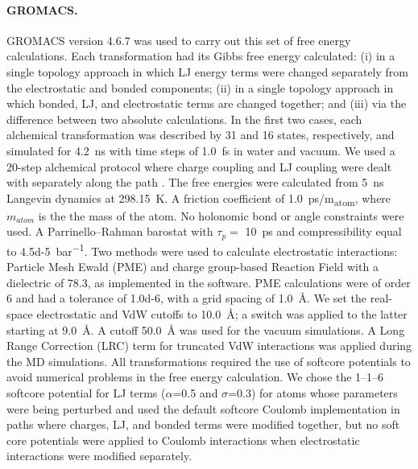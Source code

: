\documentclass[journal=jctcce,manuscript=article]{achemso}
\begin{document}
\paragraph{GROMACS.} 
GROMACS version 4.6.7 was used to carry out this set of free energy calculations. 
%
Each transformation had its Gibbs free energy calculated: 
(i) in a single topology approach in which LJ energy terms were changed separately from the electrostatic and bonded components; 
(ii) in a single topology approach in which bonded, LJ, and electrostatic terms are changed together; and 
(iii) via the difference between two absolute calculations.
In the first two cases, each alchemical transformation was described by 31 and 16 states, respectively, and simulated for \SI{4.2}{ns} with time steps of \SI{1.0}{fs} in water and vacuum. 
We used a 20-step alchemical protocol where charge coupling and LJ coupling were dealt with separately along the path \cite{Mobley2014, doi:10.1021/acs.jced.7b00104}.
%
The free energies were calculated from \SI{5}{ns} Langevin dynamics at \SI{298.15}{K}. 
A friction coefficient of \SI{1.0}{ps/m_{atom}}, where $m_{atom}$ is the the mass of the atom.  
No holonomic bond or angle constraints were used. 
A Parrinello--Rahman barostat with $\tau_p =$ \SI{10}{ps} and compressibility equal to \SI{4.5d-5}{bar^{-1}}.
%
Two methods were used to calculate electrostatic interactions: 
Particle Mesh Ewald (PME) and charge group-based Reaction Field with a dielectric of 78.3, as implemented in the software. 
PME calculations were of order 6 and had a tolerance of \num{1.0d-6}, with a grid spacing of \SI{1.0}{\angstrom}. 
We set the real-space electrostatic and VdW cutoffs to \SI{10.0}{\angstrom}; a switch was applied to the latter starting at \SI{9.0}{\angstrom}. 
A cutoff \SI{50.0}{\angstrom} was used for the vacuum simulations.
%
A Long Range Correction (LRC) term for truncated VdW interactions was applied during the MD simulations. 
%
All transformations required the use of softcore potentials to avoid numerical problems in the free energy calculation.  
We chose the 1--1--6 softcore potential for LJ terms ($\alpha$=0.5 and $\sigma$=0.3) for atoms whose parameters were being perturbed
and used the default softcore Coulomb implementation in paths where charges, LJ, and bonded terms were modified together, 
but no soft core potentials were applied to Coulomb interactions when electrostatic interactions were modified separately.  
\end{document}
